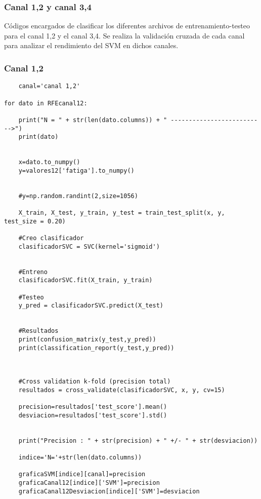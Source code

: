\subsubsection{Canal 1,2 y canal 3,4}
Códigos encargados de clasificar los diferentes archivos de entrenamiento-testeo para el canal 1,2 y el canal 3,4.  Se realiza la validación cruzada de cada canal para analizar el rendimiento del SVM en dichos canales.
    \subsubsection{Canal 1,2}
    \begin{lstlisting}
    canal='canal 1,2'

for dato in RFEcanal12:
    
    print("N = " + str(len(dato.columns)) + " -------------------------->")
    print(dato)
    
    
    x=dato.to_numpy()
    y=valores12['fatiga'].to_numpy()

    
    #y=np.random.randint(2,size=1056)
    
    X_train, X_test, y_train, y_test = train_test_split(x, y, test_size = 0.20)
    
    #Creo clasificador
    clasificadorSVC = SVC(kernel='sigmoid')


    #Entreno
    clasificadorSVC.fit(X_train, y_train)

    #Testeo 
    y_pred = clasificadorSVC.predict(X_test)


    #Resultados
    print(confusion_matrix(y_test,y_pred))
    print(classification_report(y_test,y_pred))



    #Cross validation k-fold (precision total)
    resultados = cross_validate(clasificadorSVC, x, y, cv=15)
    
    precision=resultados['test_score'].mean()
    desviacion=resultados['test_score'].std()
    
    
    print("Precision : " + str(precision) + " +/- " + str(desviacion))
    
    indice='N='+str(len(dato.columns))
    
    graficaSVM[indice][canal]=precision
    graficaCanal12[indice]['SVM']=precision
    graficaCanal12Desviacion[indice]['SVM']=desviacion
    \end{lstlisting}
